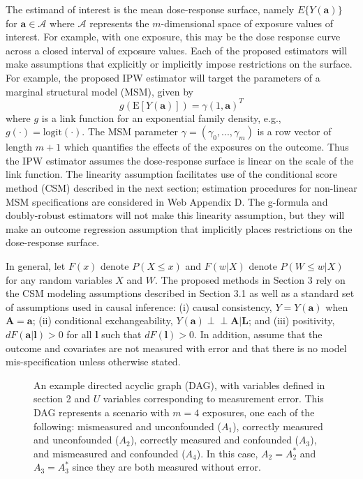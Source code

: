\documentclass[useAMS,usenatbib,referee]{biom}
\begin{document}
The estimand of interest is the mean dose-response surface, namely $E\{ Y(\bm{a}) \}$ for $\bm{a} \in \bm{\mathcal{A}}$ where $\bm{\mathcal{A}}$ represents the $m$-dimensional space of exposure values of interest. For example, with one exposure, this may be the dose response curve across a closed interval of exposure values. Each of the proposed estimators will make assumptions that explicitly or implicitly impose restrictions on the surface. For example, the proposed IPW estimator will target the parameters of a marginal structural model (MSM), given by
\begin{equation}
    g(\text{E}[Y(\bm{a})]) = \gamma (1, \bm{a})^{T}
\end{equation}
where $g$ is a link function for an exponential family density, e.g., $g(\cdot) = \text{logit}(\cdot)$. The MSM parameter $\gamma = (\gamma_{0}, ..., \gamma_{m})$ is a row vector of length $m+1$ which quantifies the effects of the exposures on the outcome. Thus the IPW estimator assumes the dose-response surface is linear on the scale of the link function. The linearity assumption facilitates use of the conditional score method (CSM) described in the next section; estimation procedures for non-linear MSM specifications are considered in Web Appendix D. The g-formula and doubly-robust estimators will not make this linearity assumption, but they will make an outcome regression assumption that implicitly places restrictions on the dose-response surface.

In general, let $F(x)$ denote $P(X \leq x)$ and $F(w | X)$ denote $P(W \leq w | X)$ for any random variables $X$ and $W$. The proposed methods in Section 3 rely on the CSM modeling assumptions described in Section 3.1 as well as a standard set of assumptions used in causal inference: (i) causal consistency, $Y = Y(\bm{a})$ when $\bm{A} = \bm{a}$; (ii) conditional exchangeability, $Y(\bm{a}) \perp \!\!\! \perp \bm{A} | \bm{L}$; and (iii) positivity, $dF(\bm{a} | \bm{l}) > 0$ for all $\bm{l}$ such that $dF(\bm{l}) > 0$. In addition, assume that the outcome and covariates are not measured with error and that there is no model mis-specification unless otherwise stated.

\begin{figure}
\centering
{}
\caption{An example directed acyclic graph (DAG), with variables defined in section 2 and $U$ variables corresponding to measurement error. This DAG represents a scenario with $m=4$ exposures, one each of the following: mismeasured and unconfounded ($A_{1}$), correctly measured and unconfounded ($A_{2}$), correctly measured and confounded ($A_{3}$), and mismeasured and confounded ($A_{4}$). In this case, $A_{2} = A^{*}_{2}$ and $A_{3} = A^{*}_{3}$ since they are both measured without error.}
\label{fig:one}
\end{figure}
\end{document}
